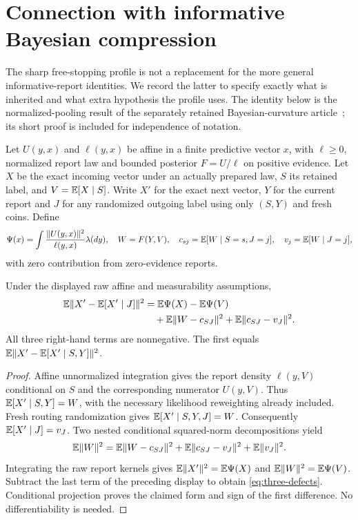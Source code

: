 \section{Connection with informative Bayesian compression}\label{app:bayesian}
The sharp free-stopping profile is not a replacement for the more general informative-report identities. We record the latter to specify exactly what is inherited and what extra hypothesis the profile uses. The identity below is the normalized-pooling result of the separately retained Bayesian-curvature article~\cite{GTFBayes}; its short proof is included for independence of notation.

Let $U(y,x)$ and $\ell(y,x)$ be affine in a finite predictive vector $x$, with $\ell\ge0$, normalized report law and bounded posterior $F=U/\ell$ on positive evidence. Let $X$ be the exact incoming vector under an actually prepared law, $S$ its retained label, and $V=\mathbb E[X\mid S]$. Write $X'$ for the exact next vector, $Y$ for the current report and $J$ for any randomized outgoing label using only $(S,Y)$ and fresh coins. Define
\[
 \Psi(x)=\int\frac{\lVert U(y,x)\rVert^2}{\ell(y,x)}\lambda(dy),\quad
 W=F(Y,V),\quad c_{sj}=\mathbb E[W\mid S=s,J=j],\quad v_j=\mathbb E[W\mid J=j],
\]
with zero contribution from zero-evidence reports.

\begin{proposition}\label{prop:bayesian}
Under the displayed raw affine and measurability assumptions,
\begin{align}
 \mathbb E\lVert X'-\mathbb E[X'\mid J]\rVert^2
 &=\mathbb E\Psi(X)-\mathbb E\Psi(V)\notag\\
 &\quad+\mathbb E\lVert W-c_{SJ}\rVert^2+\mathbb E\lVert c_{SJ}-v_J\rVert^2.\label{eq:three-defects}
\end{align}
All three right-hand terms are nonnegative. The first equals
$\mathbb E\lVert X'-\mathbb E[X'\mid S,Y]\rVert^2$.
\end{proposition}
\begin{proof}
Affine unnormalized integration gives the report density $\ell(y,V)$ conditional on $S$ and the corresponding numerator $U(y,V)$. Thus $\mathbb E[X'\mid S,Y]=W$, with the necessary likelihood reweighting already included. Fresh routing randomization gives $\mathbb E[X'\mid S,Y,J]=W$. Consequently $\mathbb E[X'\mid J]=v_J$. Two nested conditional squared-norm decompositions yield
\[
 \mathbb E\lVert W\rVert^2=\mathbb E\lVert W-c_{SJ}\rVert^2+\mathbb E\lVert c_{SJ}-v_J\rVert^2+\mathbb E\lVert v_J\rVert^2.
\]
Integrating the raw report kernels gives $\mathbb E\lVert X'\rVert^2=\mathbb E\Psi(X)$ and $\mathbb E\lVert W\rVert^2=\mathbb E\Psi(V)$. Subtract the last term of the preceding display to obtain \eqref{eq:three-defects}. Conditional projection proves the claimed form and sign of the first difference. No differentiability is needed.
\end{proof}

